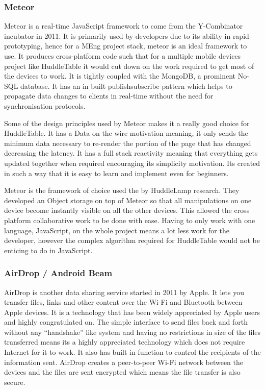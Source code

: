 \subsubsection{Meteor}

Meteor\cite{meteor} is a real-time JavaScript framework to come from
the Y-Combinator incubator in 2011. It is primarily used by developers
due to its ability in rapid-prototyping, hence for a MEng project
stack, meteor is an ideal framework to use. It produces cross-platform
code such that for a multiple mobile devices project like HuddleTable
it would cut down on the work required to get most of the devices
to work. It is tightly coupled with the MongoDB, a prominent No-SQL
database. It has an in built publish\textendash subscribe pattern\cite{pub-sub-pattern}
which helps to propagate data changes to clients in real-time without
the need for synchronisation protocols.

Some of the design principles used by Meteor makes it a really good
choice for HuddleTable. It has a Data on the wire motivation meaning,
it only sends the minimum data necessary to re-render the portion
of the page that has changed decreasing the latency. It has a full
stack reactivity\cite{meteor-wiki} meaning that everything gets updated
together when required encouraging its simplicity motivation. Its
created in such a way that it is easy to learn and implement even
for beginners. 

Meteor is the framework of choice used the by HuddleLamp research.
They developed an Object storage on top of Meteor so that all manipulations
on one device become instantly visible on all the other devices. This
allowed the cross platform collaborative work to be done with ease.
Having to only work with one language, JavaScript, on the whole project
means a lot less work for the developer, however the complex algorithm
required for HuddleTable would not be enticing to do in JavaScript.


\subsubsection{AirDrop / Android Beam}

AirDrop\cite{airdrop} is another data sharing service started in
2011 by Apple. It lets you transfer files, links and other content
over the Wi-Fi and Bluetooth between Apple devices. It is a technology
that has been widely appreciated by Apple users and highly congratulated
on. The simple interface to send files back and forth without any
``handshake'' like system and having no restrictions in size of
the files transferred means its a highly appreciated technology which
does not require Internet for it to work. It also has built in function
to control the recipients of the information sent. AirDrop creates
a peer-to-peer Wi-Fi network between the devices and the files are
sent encrypted which means the file transfer is also secure.

